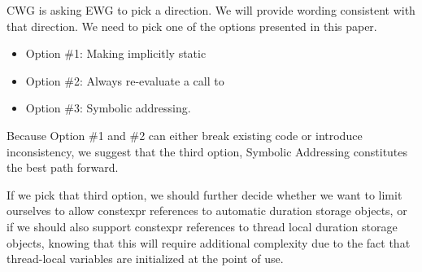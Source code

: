 \documentclass{wg21}
\begin{document}
CWG is asking EWG to pick a direction. We will provide wording consistent with that direction.
We need to pick one of the options presented in this paper.

\begin{itemize}
\item Option \#1: Making  implicitly static
\item Option \#2: Always re-evaluate a call to 
\item Option \#3: Symbolic addressing.
\end{itemize}

Because Option \#1 and \#2 can either break existing code or introduce inconsistency, we suggest that the third option, Symbolic Addressing
constitutes the best path forward.

If we pick that third option, we should further decide whether we want to limit ourselves to allow constexpr references to automatic duration storage objects, or if we should also support
constexpr references to thread local duration storage objects, knowing that this will require additional complexity due to the fact that
thread-local variables are initialized at the point of use.
\end{document}
